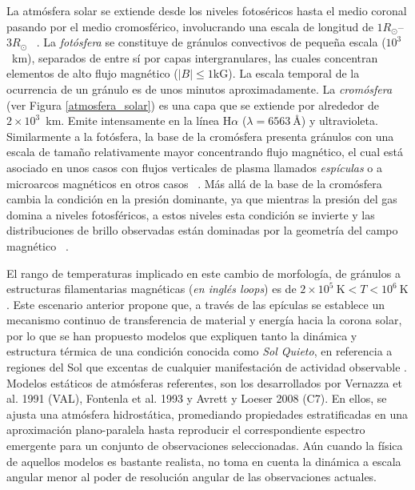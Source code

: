 La atm\'osfera solar se extiende desde los niveles fotos\'ericos hasta el medio coronal pasando por el medio cromosf\'erico, involucrando una escala de longitud de $1R_{\odot}$--$3R_{\odot}$ ~\citep{NASAsun}. La \emph{fot\'osfera} se constituye de gr\'anulos convectivos de peque\~na escala ($10^3$~km), separados de entre s\'i por capas intergranulares, las cuales concentran elementos de alto flujo magn\'etico ($|B| \le 1\mbox{kG}$). La escala temporal de la ocurrencia de un gr\'anulo es de unos minutos aproximadamente. La \emph{crom\'osfera} (ver Figura \ref{atmosfera_solar}) es una capa que se extiende por alrededor de $2\times 10^3$~km. Emite intensamente en la l\'inea H$\alpha$ ($\lambda=6563~\mbox{\AA}$) y ultravioleta. Similarmente a la fot\'osfera, la base de la crom\'osfera presenta gr\'anulos con una escala de tama\~no relativamente mayor concentrando flujo magn\'etico, el cual est\'a asociado en unos casos con flujos verticales de plasma llamados \emph{esp\'iculas} o a microarcos magn\'eticos en otros casos ~\citep{NASAweb}. M\'as all\'a de la base de la crom\'osfera cambia la condici\'on en la presi\'on dominante, ya que mientras la presi\'on del gas domina a niveles fotosf\'ericos, a estos niveles esta condici\'on se invierte y las distribuciones de brillo observadas est\'an dominadas por la geometr\'ia del campo magn\'etico ~\citep{priest}.


El rango de temperaturas implicado en este cambio de morfolog\'ia, de gr\'anulos a estructuras filamentarias magn\'eticas (\emph{en ingl\'es loops}) es de $2\times 10^5~\mbox{K} < T < 10^6~\mbox{K}$. Este escenario anterior propone que, a trav\'es de las ep\'iculas se establece un mecanismo continuo de transferencia de material y energ\'ia hacia la corona solar, por lo que se han propuesto modelos que expliquen tanto la din\'amica y estructura t\'ermica de una condici\'on conocida como \emph{Sol Quieto}, en referencia a regiones del Sol que excentas de cualquier manifestaci\'on de actividad observable \citep{ashwanden}. Modelos est\'aticos de atm\'osferas referentes, son los desarrollados por Vernazza et al. 1991 (VAL), Fontenla et al. 1993 y Avrett y Loeser 2008 (C7). En ellos, se ajusta una atm\'osfera hidrost\'atica, promediando propiedades estratificadas en una aproximaci\'on plano-paralela hasta reproducir el correspondiente espectro emergente para un conjunto de observaciones seleccionadas. A\'un cuando la f\'isica de aquellos modelos es bastante realista, no toma en cuenta la din\'amica a escala angular menor al poder de resoluci\'on angular de las observaciones actuales.


